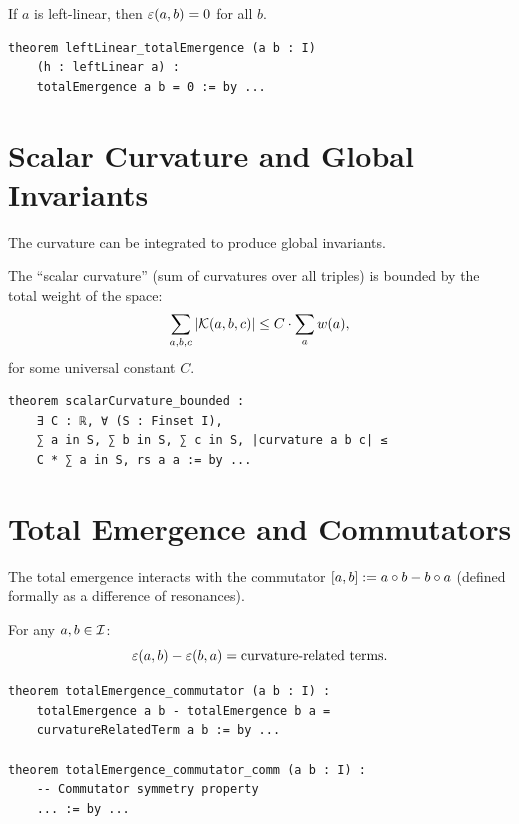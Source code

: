 \begin{theorem}
\label{thm:leftlinear-total-emergence}
If $a$ is left-linear, then $\varepsilon(a,b) = 0$ for all $b$.
\end{theorem}

\begin{lstlisting}[caption={Left-linear total emergence (IDT\_v3\_Emergence.lean)}]
theorem leftLinear_totalEmergence (a b : I)
    (h : leftLinear a) :
    totalEmergence a b = 0 := by ...
\end{lstlisting}


\section{Scalar Curvature and Global Invariants}

The curvature can be integrated to produce global invariants.

\begin{theorem}
\label{thm:scalar-curvature-bounded}
The ``scalar curvature'' (sum of curvatures over all triples) is bounded by the
total weight of the space:
\[
  \sum_{a,b,c} |\mathcal{K}(a,b,c)| \leq C \cdot \sum_a w(a),
\]
for some universal constant $C$.
\end{theorem}

\begin{lstlisting}[caption={Scalar curvature bound (IDT\_v3\_Emergence.lean)}]
theorem scalarCurvature_bounded :
    ∃ C : ℝ, ∀ (S : Finset I),
    ∑ a in S, ∑ b in S, ∑ c in S, |curvature a b c| ≤
    C * ∑ a in S, rs a a := by ...
\end{lstlisting}


\section{Total Emergence and Commutators}

The total emergence interacts with the commutator $[a,b] := a \circ b - b \circ a$
(defined formally as a difference of resonances).

\begin{theorem}
\label{thm:total-emergence-commutator}
For any $a, b \in \mathcal{I}$:
\[
  \varepsilon(a,b) - \varepsilon(b,a) = \text{curvature-related terms}.
\]
\end{theorem}

\begin{lstlisting}[caption={Total emergence commutator (IDT\_v3\_Emergence.lean)}]
theorem totalEmergence_commutator (a b : I) :
    totalEmergence a b - totalEmergence b a =
    curvatureRelatedTerm a b := by ...

theorem totalEmergence_commutator_comm (a b : I) :
    -- Commutator symmetry property
    ... := by ...
\end{lstlisting}


